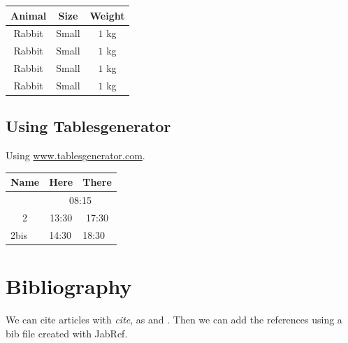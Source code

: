 \documentclass[10pt,a4paper]{article}
\begin{document}
\vspace{1cm}
\begin{tabular}{ccc}
\toprule
    \textbf{Animal} & \textbf{Size} & \textbf{Weight} \\
    \midrule
    Rabbit          & Small         & $1$ kg          \\
    Rabbit          & Small         & $1$ kg          \\
    Rabbit          & Small         & $1$ kg          \\
    Rabbit          & Small         & $1$ kg          \\
    \bottomrule
\end{tabular}
\vspace{1cm}

\subsection{Using Tablesgenerator}

Using \url{www.tablesgenerator.com}.

\vspace{1cm}

\begin{tabular}{@{}ccc@{}}
    \toprule
    \cellcolor[HTML]{6665CD}Name                    & \cellcolor[HTML]{6665CD}Here                       & There                      \\ \midrule
    \rowcolor[HTML]{6665CD}
    \multicolumn{1}{|c|}{\cellcolor[HTML]{6665CD}1} & \multicolumn{2}{c|}{\cellcolor[HTML]{6665CD}08:15}                              \\ \midrule
    \multicolumn{1}{|c|}{2}                         & \multicolumn{1}{c|}{13:30}                         & \multicolumn{1}{c|}{17:30} \\ \midrule
    \multicolumn{1}{l}{2bis}                        & \multicolumn{1}{l}{14:30}                          & \multicolumn{1}{l}{18:30}  \\ \bottomrule
\end{tabular}


\section{Bibliography}
We can cite articles with \emph{cite}, as \cite{Smai2020} and \cite{Chave2012}. Then we can add the references using a bib file created with JabRef.



\end{document}
